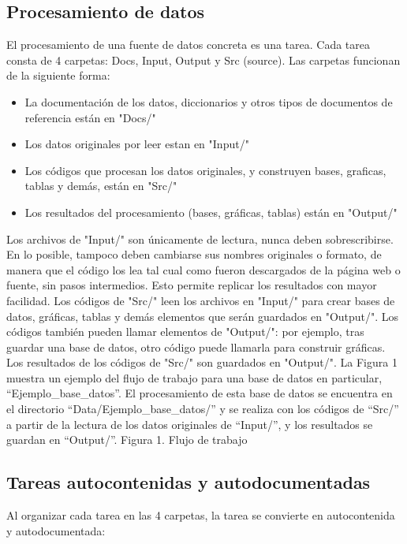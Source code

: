 \subsection{Procesamiento de datos}
El procesamiento de una fuente de datos concreta es una tarea. Cada tarea consta de 4 carpetas: Docs, Input, Output y Src (source). Las carpetas funcionan de la siguiente forma:
\begin{itemize}
    \item  La documentación de los datos, diccionarios y otros tipos de documentos de referencia están en "Docs/"
    \item Los datos originales por leer estan en "Input/"
    \item Los códigos que procesan los datos originales, y construyen bases, graficas, tablas y demás, están en "Src/" 
 \item Los resultados del procesamiento (bases, gráficas, tablas) están en "Output/"
\end{itemize}

Los archivos de "Input/" son únicamente de lectura, nunca deben sobrescribirse. En lo posible, tampoco deben cambiarse sus nombres originales o formato, de manera que el código los lea tal cual como fueron descargados de la página web o fuente, sin pasos intermedios. Esto permite replicar los resultados con mayor facilidad. 
Los códigos de "Src/" leen los archivos en "Input/" para crear bases de datos, gráficas, tablas y demás elementos que serán guardados en "Output/". Los códigos también pueden llamar elementos de "Output/": por ejemplo, tras guardar una base de datos, otro código puede llamarla para construir gráficas. 
Los resultados de los códigos de "Src/" son guardados en "Output/".
La Figura 1 muestra un ejemplo del flujo de trabajo para una base de datos en particular, “Ejemplo\_base\_datos”. El procesamiento de esta base de datos se encuentra en el directorio “Data/Ejemplo\_base\_datos/” y se realiza con los códigos de “Src/” a partir de la lectura de los datos originales de “Input/”, y los resultados se guardan en “Output/”.
Figura 1. Flujo de trabajo
 

\subsection{Tareas autocontenidas y autodocumentadas}
Al organizar cada tarea en las 4 carpetas, la tarea se convierte en autocontenida y autodocumentada:

